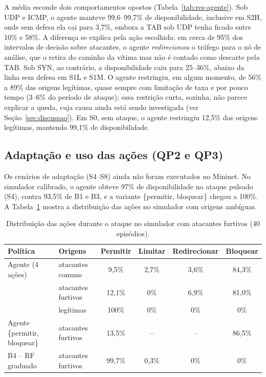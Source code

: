 \documentclass[12pt]{article}
\begin{document}
A média esconde dois comportamentos opostos (Tabela~\ref{tab:res-agente}).
Sob UDP e ICMP, o agente manteve 99,6--99,7\% de disponibilidade, inclusive
em S2H, onde sem defesa ela cai para 3,7\%, embora a TAB sob UDP tenha ficado
entre 10\% e 58\%. A diferença se explica pela ação escolhida: em cerca de 95\% dos
intervalos de decisão sobre atacantes, o agente \emph{redirecionou} o tráfego
para o nó de análise, que o retira do caminho da vítima mas não é contado como
descarte pela TAB. Sob SYN, ao contrário, a disponibilidade caiu para
25--36\%, abaixo da linha sem defesa em S1L e S1M. O agente restringiu, em
algum momento, de 56\% a 89\% das origens legítimas, quase sempre com
limitação de taxa e por pouco tempo (3--6\% do período de ataque); essa
restrição curta, sozinha, não parece explicar a queda, cuja causa ainda está
sendo investigada (ver Seção~\ref{sec:discussao}). Em S0, sem ataque, o agente
restringiu 12,5\% das origens legítimas, mantendo 99,1\% de disponibilidade.

\subsection{Adaptação e uso das ações (QP2 e QP3)}

Os cenários de adaptação (S4--S8) ainda não foram executados no Mininet. No
simulador calibrado, o agente obteve 97\% de disponibilidade no ataque
pulsado (S4), contra 93,5\% de B1 e B3, e a variante \{permitir, bloquear\}
chegou a 100\%. A Tabela~\ref{tab:res-acoes} mostra a distribuição das ações
no simulador com origens ambíguas.

\begin{table}[ht]
\centering
\caption{Distribuição das ações durante o ataque no simulador com atacantes
  furtivos (40 episódios).}
\label{tab:res-acoes}
\footnotesize
\begin{tabular}{@{}llcccc@{}}
\toprule
\textbf{Política} & \textbf{Origens} & \textbf{Permitir} & \textbf{Limitar} &
\textbf{Redirecionar} & \textbf{Bloquear} \\
\midrule
Agente (4 ações) & atacantes comuns   & 9,5\% & 2,7\% & 3,6\% & 84,3\% \\
                 & atacantes furtivos & 12,1\% & 0\% & 6,9\% & 81,0\% \\
                 & legítimas          & 100\% & 0\% & 0\% & 0\% \\
Agente \{permitir, bloquear\} & atacantes furtivos & 13,5\% & -- & -- & 86,5\% \\
B4 -- RF graduado & atacantes furtivos & 99,7\% & 0,3\% & 0\% & 0\% \\
\bottomrule
\end{tabular}
\end{table}
\end{document}
